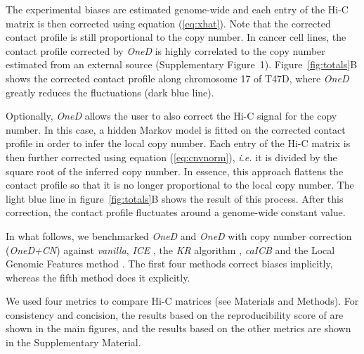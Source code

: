 \documentclass[a4,center,fleqn]{NAR}
\begin{document}
The experimental biases are estimated genome-wide and each entry of the
Hi-C matrix is then corrected using equation (\ref{eq:xhat}). Note that
the corrected contact profile is still proportional to the copy number.
In cancer cell lines, the contact profile corrected by \textit{OneD} is
highly correlated to the copy number estimated from an external source
(Supplementary Figure~1). Figure~\ref{fig:totals}B shows the corrected
contact profile along chromosome 17 of T47D, where \textit{OneD} greatly
reduces the fluctuations (dark blue line).

Optionally, \textit{OneD} allows the user to also correct the Hi-C signal
for the copy number. In this case, a hidden Markov model is fitted on the
corrected contact profile in order to infer the local copy number. Each
entry of the Hi-C matrix is then further corrected using equation
(\ref{eq:cnvnorm}), \textit{i.e.} it is divided by the square root of the
inferred copy number. In essence, this approach flattens the contact
profile so that it is no longer proportional to the local copy number. The
light blue line in figure~\ref{fig:totals}B shows the result of this
process. After this correction, the contact profile fluctuates around a
genome-wide constant value.

In what follows, we benchmarked \textit{OneD} and \textit{OneD} with copy
number correction (\textit{OneD+CN}) against \textit{vanilla},
\textit{ICE} \citep{imakaev2012iterative}, the \textit{KR} algorithm
\citep{knight2013fast}, \textit{caICB} \citep{wu2016computational} and the
Local Genomic Features method \citep[\textit{HiCNorm},][]{hu2012hicnorm,
servant2012hitc}. The first four methods correct biases implicitly,
whereas the fifth method does it explicitly.

We used four metrics to compare Hi-C matrices (see Materials and Methods).
For consistency and concision, the results based on the reproducibility
score of \cite{yan2017hicspector} are shown in the main figures, and the
results based on the other metrics are shown in the Supplementary
Material.
\end{document}
